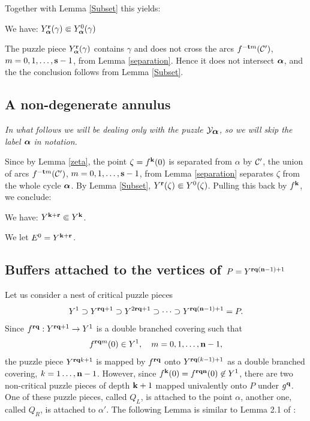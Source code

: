 Together with Lemma \ref{Subset} this yields: 

\begin{cor} We have:
  $Y_{\mbox{\scriptsize\boldmath$\alpha$} }^{{\mathbf{r}}}(\gamma) \Subset Y^0_{\mbox{\scriptsize\boldmath$\alpha$} } (\gamma)$ %
\end{cor}


\begin{pf}
   The puzzle piece $Y_{\mbox{\scriptsize\boldmath$\alpha$} }^{{\mathbf{r}}}(\gamma)$ contains $\gamma$ and does not cross the arcs 
$f^{-{\mathbf{t}} m} ({\mathcal C}')$, $m=0,1,\dots, {\mathbf{s}}-1$, from Lemma \ref{separation}.
Hence it does not intersect ${\mbox{\boldmath$\alpha$} }$, and the the conclusion follows from Lemma \ref{Subset}.
\end{pf}


 \subsection{A non-degenerate annulus} 

 {\it In what follows we will be dealing only with the puzzle ${\mathcal Y}_{\mbox{\boldmath$\alpha$} }$, so we will skip the label ${\mbox{\boldmath$\alpha$} }$
in notation.} 
  
Since by Lemma \ref{zeta}, the point $\zeta =f^{\mathbf{k}} (0)$ is separated from $\alpha$ by ${\mathcal C}'$,
the union of arcs $f^{-{\mathbf{t}} m} ({\mathcal C}')$, $m=0,1,\dots, {\mathbf{s}}-1$, from Lemma \ref{separation}
separates $\zeta$ from the whole cycle ${\mbox{\boldmath$\alpha$} }$.
By Lemma \ref{Subset},  $Y^{{\mathbf{r}}}(\zeta)\Subset Y^0(\zeta)$.
Pulling this back by $ f^{\mathbf{k}}$,  we conclude:

\begin{lem}
We have: 
       $Y^{{\mathbf{k}}+{\mathbf{r}}} \Subset  Y^{\mathbf{k}}$.
\end{lem}

We let $E^0= Y^{{\mathbf{k}}+{\mathbf{r}}}$. 

\subsection{Buffers attached to the vertices of $P=Y^{{\mathbf{r}}{\mathbf{q}} ({\mathbf{n}}-1)+1}$}\label{P-sec}


 Let us consider a nest of critical puzzle pieces
$$
   Y^1 \supset  Y^{ {\mathbf{r}}{\mathbf{q}} +1 } \supset Y^{2{\mathbf{r}}{\mathbf{q}}+1 } \supset\dots \supset Y^{{\mathbf{r}}{\mathbf{q}} ({\mathbf{n}}-1)+1} = P. 
$$
 Since $f^{{\mathbf{r}}{\mathbf{q}}} : Y^{{\mathbf{r}}{\mathbf{q}}+1}\rightarrow Y^1 $ is a double branched covering such that
$$
   f^{{\mathbf{r}}{\mathbf{q}} m}(0)\in Y^1, \quad m=0,1,\dots, {\mathbf{n}}-1,
$$
the puzzle piece $Y^{{\mathbf{r}}{\mathbf{q}} k+1}$  is mapped by 
 $f^{{\mathbf{r}}{\mathbf{q}}}$ onto $Y^{{\mathbf{r}}{\mathbf{q}} (k-1)+1}$ as a double branched covering, $k=1\dots,{\mathbf{n}}-1 $. 
However, since $f^{\mathbf{k}}(0)=f^{{\mathbf{r}}{\mathbf{q}}{\mathbf{n}}}(0)\not\in Y^1$, there are two non-critical puzzle pieces of depth 
${\mathbf{k}}+1$ mapped univalently onto $P$ under $g^{{\mathbf{q}}}$.  
One of these puzzle pieces, called $Q_L$, is attached to the point $\alpha$,
another one, called $Q_R$, is attached to $\alpha'$.
The following Lemma is similar to Lemma  2.1 of \cite{decorations}:

